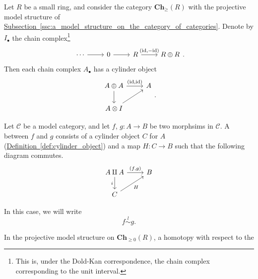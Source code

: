 \documentclass[main.tex]{subfiles}
\begin{document}
\begin{example}
  Let $R$ be a small ring, and consider the category $\mathbf{Ch}_{\geq}(R)$ with the projective model structure of \hyperref[ssc:a_model_structure_on_the_category_of_categories]{Subsection~\ref*{ssc:a_model_structure_on_the_category_of_categories}}. Denote by $I_{\bullet}$ the chain complex\footnote{This is, under the Dold-Kan correspondence, the chain complex corresponding to the unit interval.}
  \begin{equation*}
    \begin{tikzcd}
      \cdots
      \arrow[r]
      & 0
      \arrow[r]
      & R
      \arrow[r, "{( \id, -\id )}"]
      & R \oplus R
    \end{tikzcd}.
  \end{equation*}
  Then each chain complex $A_{\bullet}$ has a cylinder object
  \begin{equation*}
    \begin{tikzcd}
      A \oplus A
      \arrow[d]
      \arrow[r, "{(\id, \id)}"]
      & A
      \\
      A \otimes I
      \arrow[ur]
    \end{tikzcd}.
  \end{equation*}
\end{example}

\begin{definition}
  \label{def:left_homotopy}
  Let $\mathcal{C}$ be a model category, and let $f$, $g\colon A \to B$ be two morphsims in $\mathcal{C}$. A  between $f$ and $g$ consists of a cylinder object $C$ for $A$ (\hyperref[def:cylinder_object]{Definition~\ref*{def:cylinder_object}}) and a map $H\colon C \to B$ such that the following diagram commutes.
  \begin{equation*}
    \begin{tikzcd}
      A \amalg A
      \arrow[d, swap, "i"]
      \arrow[r, "{(f, g)}"]
      & B
      \\
      C
      \arrow[ur, swap, "H"]
    \end{tikzcd}
  \end{equation*}

  In this case, we will write
  \begin{equation*}
    f \overset{l}{\sim} g.
  \end{equation*}
\end{definition}

\begin{example}
  In the projective model structure on $\mathbf{Ch}_{\geq 0}(R)$, a homotopy with respect to the 
\end{example}
\end{document}
